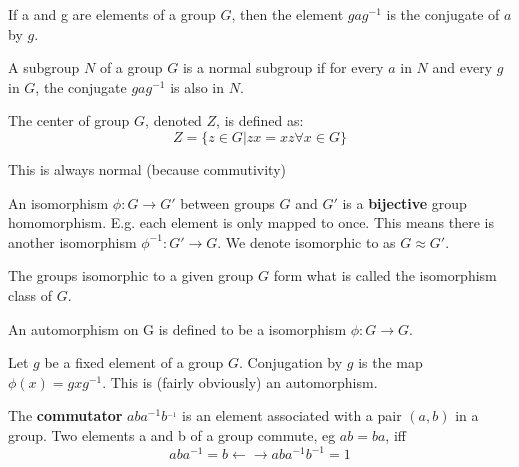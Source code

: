 \begin{definition}
  If a and g are elements of a group $G$, then the element $gag^{{-1}}$ is
  the conjugate of $a$ by $g$.
\end{definition}

\begin{definition}
  A subgroup $N$ of a group $G$ is a normal subgroup if for every $a$ in $N$ and
  every $g$ in $G$, the conjugate $gag^{-1}$ is also in $N$.
\end{definition}

\begin{definition}
  The center of group $G$, denoted $Z$, is defined as:
  \[Z = \{z \in G | zx = xz \forall x \in G\}\]

  This is always normal (because commutivity)
\end{definition}

\begin{definition}
  An isomorphism $\phi: G \rightarrow G'$ between groups $G$ and $G'$ is a
  \textbf{bijective} group homomorphism. E.g. each element is only mapped to
  once. This means there is another isomorphism $\phi^{{-1}}: G' \rightarrow G$.
  We denote isomorphic to as $G \approx G'$.
\end{definition}

\begin{definition}
  The groups isomorphic to a given group $G$ form what is called the isomorphism
  class of $G$.
\end{definition}

\begin{definition}
  An automorphism on G is defined to be a isomorphism $\phi: G \rightarrow G$.
\end{definition}

\begin{definition}

  Let $g$ be a fixed element of a group $G$. Conjugation by $g$ is the map
  $\phi(x) = g x g^{-1}$. This is (fairly obviously) an automorphism.

\end{definition}

\begin{definition}
  The \textbf{commutator} $aba^{-1}b^{_{-1}}$ is an element associated with a pair $(a,b)$
  in a group. Two elements a and b of a group commute, eg $ab=ba$, iff
  \[aba^{-1}=b \leftarrow \rightarrow aba^{-1}b^{-1} = 1\]

\end{definition}

